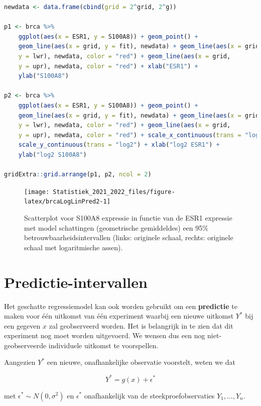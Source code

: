 \documentclass[
  12pt,dutch,coursenotes]{book}
\theoremstyle{definition}
\theoremstyle{definition}
\theoremstyle{definition}
\theoremstyle{definition}
\theoremstyle{remark}
\begin{document}
\begin{lstlisting}[language=R]
newdata <- data.frame(cbind(grid = 2^grid, 2^g))

p1 <- brca %>%
    ggplot(aes(x = ESR1, y = S100A8)) + geom_point() +
    geom_line(aes(x = grid, y = fit), newdata) + geom_line(aes(x = grid,
    y = lwr), newdata, color = "red") + geom_line(aes(x = grid,
    y = upr), newdata, color = "red") + xlab("ESR1") +
    ylab("S100A8")

p2 <- brca %>%
    ggplot(aes(x = ESR1, y = S100A8)) + geom_point() +
    geom_line(aes(x = grid, y = fit), newdata) + geom_line(aes(x = grid,
    y = lwr), newdata, color = "red") + geom_line(aes(x = grid,
    y = upr), newdata, color = "red") + scale_x_continuous(trans = "log2") +
    scale_y_continuous(trans = "log2") + xlab("log2 ESR1") +
    ylab("log2 S100A8")

gridExtra::grid.arrange(p1, p2, ncol = 2)
\end{lstlisting}

\begin{figure}

{\centering \texttt{[image: Statistiek\_2021\_2022\_files/figure-latex/brcaLogLinPred2-1]} 

}

\caption{Scatterplot voor S100A8 expressie in functie van de ESR1 expressie met model schattingen (geometrische gemiddeldes) een 95$\%$ betrouwbaarheidsintervallen (links: originele schaal, rechts: originele schaal met logaritmische assen).}\label{fig:brcaLogLinPred2}
\end{figure}

\hypertarget{predictie-intervallen}{%
\section{Predictie-intervallen}\label{predictie-intervallen}}

Het geschatte regressiemodel kan ook worden gebruikt om een \textbf{predictie} te maken voor één uitkomst van één experiment waarbij een nieuwe uitkomst \(Y^*\) bij een gegeven \(x\) zal geobserveerd worden. Het is belangrijk in te zien dat dit experiment nog moet worden uitgevoerd. We wensen dus een nog niet-geobserveerde individuele uitkomst te voorspellen.

Aangezien \(Y^*\) een nieuwe, onafhankelijke observatie voorstelt, weten we dat

\[
  Y^* = g(x) + \epsilon^*
\]

met \(\epsilon^*\sim N(0,\sigma^2)\) en \(\epsilon^*\) onafhankelijk van de steekproefobservaties \(Y_1,\ldots, Y_n\).
\end{document}

